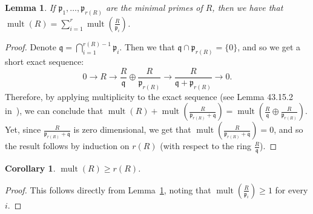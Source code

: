 \documentclass{article}
\newtheorem{lemma}[theorem]{Lemma}
\newtheorem{corollary}[theorem]{Corollary}
\DeclareMathOperator{\edim}{edim}
\DeclareMathOperator{\mult}{mult}
\numberwithin{theorem}{section}
\begin{document}
\begin{lemma}\label{lem:mult_sum_prim}
    If $\mathfrak{p}_1, \dots, \mathfrak{p}_{r(R)}$ are the minimal primes of $R$, then we have that $\mult(R)=\sum_{i=1}^r \mult\left(\frac{R}{\mathfrak{p}_i}\right)$. 
\end{lemma}

\begin{proof}
    Denote $\mathfrak{q}=\bigcap_{i=1}^{r(R)-1} \mathfrak{p}_i$. Then we that $\mathfrak{q}\cap \mathfrak{p}_{r(R)} = \{0\}$, and so we get a short exact sequence:
\begin{equation*}
    0 \to R \to \frac{R}{\mathfrak{q}} \oplus \frac{R}{\mathfrak{p}_{r(R)}} \to \frac{R}{\mathfrak{q}+\mathfrak{p}_{r(R)}} \to 0. 
\end{equation*}
Therefore, by applying multiplicity to the exact sequence (see Lemma 43.15.2 in~\cite{stacks-project}), we can conclude that $\mult(R) + \mult(\frac{R}{\mathfrak{p}_{r(R)}+\mathfrak{q}}) = \mult(\frac{R}{\mathfrak{q}} \oplus \frac{R}{\mathfrak{p}_{r(R)}})$. Yet, since $\frac{R}{\mathfrak{p}_{r(R)}+\mathfrak{q}}$ is zero dimensional, we get that  $\mult(\frac{R}{\mathfrak{p}_{r(R)}+\mathfrak{q}})=0$, and so the result follows by induction on $r(R)$ (with respect to the ring $\frac{R}{\mathfrak{q}}$). 
\end{proof}

\begin{corollary}\label{cor:mult_r}
    $\mult(R) \geq r(R)$.
\end{corollary}

\begin{proof}
    This follows directly from Lemma~\ref{lem:mult_sum_prim}, noting that $\mult \left(\frac{R}{\mathfrak{p}_i}\right) \geq 1$ for every $i$. 
\end{proof}

\end{document}
